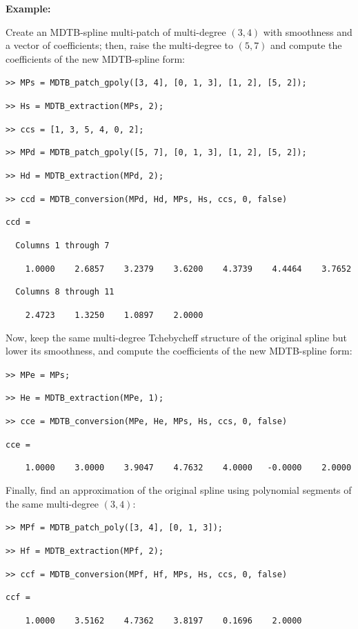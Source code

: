 \documentclass[10pt]{acmtrans2e}
\newenvironment{example}
{\vspace*{0.1cm}
\noindent \textbf{Example:} \vspace*{0.15cm}

\setlength{\parskip}{0.5ex plus 0.5exminus 0.2 ex}
}
{\medskip
}
\begin{document}
\begin{example}
\noindent Create an MDTB-spline multi-patch of multi-degree $(3,4)$ with smoothness and a vector of coefficients; then, raise the multi-degree to $(5,7)$ and compute the coefficients of the new MDTB-spline form:
\medskip

\texttt{>> MPs = MDTB\_patch\_gpoly([3, 4], [0, 1, 3], [1, 2], [5, 2]);}

\texttt{>> Hs = MDTB\_extraction(MPs, 2);}

\texttt{>> ccs = [1, 3, 5, 4, 0, 2];}

\texttt{>> MPd = MDTB\_patch\_gpoly([5, 7], [0, 1, 3], [1, 2], [5, 2]);}

\texttt{>> Hd = MDTB\_extraction(MPd, 2);}

\texttt{>> ccd = MDTB\_conversion(MPd, Hd, MPs, Hs, ccs, 0, false)}

\texttt{ccd =}

\texttt{\ \ Columns 1 through 7}

\texttt{\ \ \ \ 1.0000\ \ \ \ 2.6857\ \ \ \ 3.2379\ \ \ \ 3.6200\ \ \ \ 4.3739\ \ \ \ 4.4464\ \ \ \ 3.7652}

\texttt{\ \ Columns 8 through 11}

\texttt{\ \ \ \ 2.4723\ \ \ \ 1.3250\ \ \ \ 1.0897\ \ \ \ 2.0000}

\medskip
\noindent Now, keep the same multi-degree Tchebycheff structure of the original spline but lower its smoothness, and compute the coefficients of the new MDTB-spline form:
\medskip

\texttt{>> MPe = MPs;}

\texttt{>> He = MDTB\_extraction(MPe, 1);}

\texttt{>> cce = MDTB\_conversion(MPe, He, MPs, Hs, ccs, 0, false)}

\texttt{cce =}

\texttt{\ \ \ \ 1.0000\ \ \ \ 3.0000\ \ \ \ 3.9047\ \ \ \ 4.7632\ \ \ \ 4.0000\ \ \ -0.0000\ \ \ \ 2.0000}

\medskip
\noindent Finally, find an approximation of the original spline using polynomial segments of the same multi-degree $(3,4)$:
\medskip

\texttt{>> MPf = MDTB\_patch\_poly([3, 4], [0, 1, 3]);}

\texttt{>> Hf = MDTB\_extraction(MPf, 2);}

\texttt{>> ccf = MDTB\_conversion(MPf, Hf, MPs, Hs, ccs, 0, false)}

\texttt{ccf =}

\texttt{\ \ \ \ 1.0000\ \ \ \ 3.5162\ \ \ \ 4.7362\ \ \ \ 3.8197\ \ \ \ 0.1696\ \ \ \ 2.0000}
    

\end{example}
\end{document}
